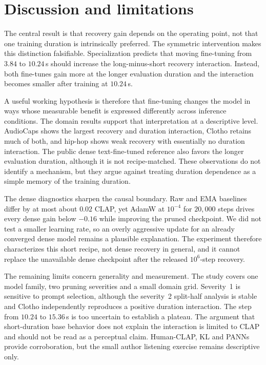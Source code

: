 \section{Discussion and limitations}
The central result is that recovery gain depends on the operating point, not that one training duration is intrinsically preferred. The symmetric intervention makes this distinction falsifiable. Specialization predicts that moving fine-tuning from $3.84$ to $10.24$\,s should increase the long-minus-short recovery interaction. Instead, both fine-tunes gain more at the longer evaluation duration and the interaction becomes smaller after training at $10.24$\,s.

A useful working hypothesis is therefore that fine-tuning changes the model in ways whose measurable benefit is expressed differently across inference conditions. The domain results support that interpretation at a descriptive level. AudioCaps shows the largest recovery and duration interaction, Clotho retains much of both, and hip-hop shows weak recovery with essentially no duration interaction. The public dense text-fine-tuned reference also favors the longer evaluation duration, although it is not recipe-matched. These observations do not identify a mechanism, but they argue against treating duration dependence as a simple memory of the training duration.

The dense diagnostics sharpen the causal boundary. Raw and EMA baselines differ by at most about $0.02$ CLAP, yet AdamW at $10^{-4}$ for $20{,}000$ steps drives every dense gain below $-0.16$ while improving the pruned checkpoint. We did not test a smaller learning rate, so an overly aggressive update for an already converged dense model remains a plausible explanation. The experiment therefore characterizes this short recipe, not dense recovery in general, and it cannot replace the unavailable dense checkpoint after the released $10^{6}$-step recovery.

The remaining limits concern generality and measurement. The study covers one model family, two pruning severities and a small domain grid. Severity~1 is sensitive to prompt selection, although the severity~2 split-half analysis is stable and Clotho independently reproduces a positive duration interaction. The step from $10.24$ to $15.36$\,s is too uncertain to establish a plateau. The argument that short-duration base behavior does not explain the interaction is limited to CLAP and should not be read as a perceptual claim. Human-CLAP, KL and PANNs provide corroboration, but the small author listening exercise remains descriptive only.

